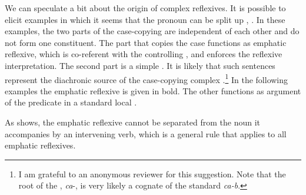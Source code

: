 We can speculate a bit about the origin of complex reflexives. It is possible to elicit examples in which it seems that the pronoun can be split up , . In these examples, the two parts of the case-copying  are independent of each other and do not form one constituent. The part that copies the case functions as emphatic reflexive, which is co-referent with the controlling , and enforces the reflexive interpretation. The second part is a simple . It is likely that such sentences represent the diachronic source of the case-copying complex .\footnote{I am grateful to an anonymous reviewer for this suggestion. Note that the root of the  , \textit{ca}-, is very likely a cognate of the standard  \textit{ca-b}.} In the following examples  the emphatic reflexive is given in bold. The other  functions as  argument of the predicate  in a standard local .
%
\begin{exe}
	\ex	\label{ex:Rashid will you please stop staring at the mirror}
	\begin{xlist}
		\ex	{}		\label{ex:Rashid will you please stop staring at the mirror@A}

		\ex	{}		\label{ex:Rashid will you please stop staring at the mirror@B}
	\end{xlist}
\end{exe}

As  shows, the emphatic reflexive cannot be separated from the noun it accompanies by an intervening verb, which is a general rule that applies to all emphatic reflexives.
%
\begin{exe}
	\ex	{}		\label{ex:Rashid will you please stop staring at the mirror@C}
\end{exe}


